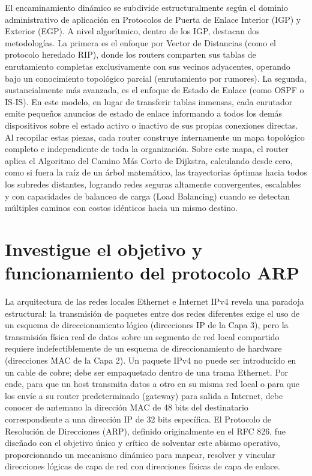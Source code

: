 \documentclass[a4paper,12pt]{article}
\begin{document}
El encaminamiento dinámico se subdivide estructuralmente según el dominio administrativo de aplicación en Protocolos de Puerta de Enlace Interior (IGP) y Exterior (EGP). A nivel algorítmico, dentro de los IGP, destacan dos metodologías. La primera es el enfoque por Vector de Distancias (como el protocolo heredado RIP), donde los routers comparten sus tablas de enrutamiento completas exclusivamente con sus vecinos adyacentes, operando bajo un conocimiento topológico parcial (enrutamiento por rumores). La segunda, sustancialmente más avanzada, es el enfoque de Estado de Enlace (como OSPF o IS-IS). En este modelo, en lugar de transferir tablas inmensas, cada enrutador emite pequeños anuncios de estado de enlace informando a todos los demás dispositivos sobre el estado activo o inactivo de sus propias conexiones directas. Al recopilar estas piezas, cada router construye internamente un mapa topológico completo e independiente de toda la organización. Sobre este mapa, el router aplica el Algoritmo del Camino Más Corto de Dijkstra, calculando desde cero, como si fuera la raíz de un árbol matemático, las trayectorias óptimas hacia todos los subredes distantes, logrando redes seguras altamente convergentes, escalables y con capacidades de balanceo de carga (Load Balancing) cuando se detectan múltiples caminos con costos idénticos hacia un mismo destino.

\section{Investigue el objetivo y funcionamiento del protocolo ARP}

La arquitectura de las redes locales Ethernet e Internet IPv4 revela una paradoja estructural: la transmisión de paquetes entre dos redes diferentes exige el uso de un esquema de direccionamiento lógico (direcciones IP de la Capa 3), pero la transmisión física real de datos sobre un segmento de red local compartido requiere indefectiblemente de un esquema de direccionamiento de hardware (direcciones MAC de la Capa 2). Un paquete IPv4 no puede ser introducido en un cable de cobre; debe ser empaquetado dentro de una trama Ethernet. Por ende, para que un host transmita datos a otro en su misma red local o para que los envíe a su router predeterminado (gateway) para salida a Internet, debe conocer de antemano la dirección MAC de 48 bits del destinatario correspondiente a una dirección IP de 32 bits específica. El Protocolo de Resolución de Direcciones (ARP), definido originalmente en el RFC 826, fue diseñado con el objetivo único y crítico de solventar este abismo operativo, proporcionando un mecanismo dinámico para mapear, resolver y vincular direcciones lógicas de capa de red con direcciones físicas de capa de enlace.
\end{document}
